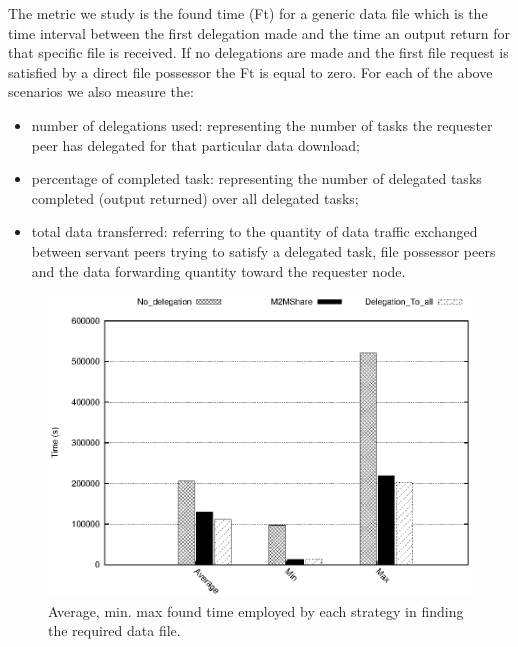The metric we study is the found time (Ft) for a generic data file which is the time interval between the first delegation made and the time an output return for that specific file is
received. If no delegations are made and the first file request is satisfied by a direct file possessor the Ft is equal to zero. For each of the above scenarios we also measure the:
\begin{itemize}
\item number of delegations used: representing the number of tasks the requester peer has delegated for that particular data download;
\item percentage of completed task: representing the number of delegated tasks completed (output returned) over all delegated tasks;
\item total data transferred: referring to the quantity of data traffic exchanged between servant peers trying to satisfy a delegated task, file possessor peers and the data forwarding quantity toward the requester node.
\end{itemize}

\begin{figure}[ht]
\centering
\includegraphics[scale=0.7]{grafici/tempi.eps}
\caption{Average, min. max found time employed by each strategy in finding the required data file.}
\label{graficoTempiVF}
\end{figure}

